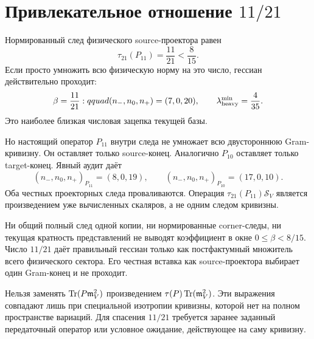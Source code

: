 \section{Привлекательное отношение \texorpdfstring{$11/21$}{11/21}}

Нормированный след физического source-проектора равен
\begin{equation}
 \tau_{21}(P_{11})=\frac{11}{21}<\frac8{15}.
 \label{eq:v7-common-trace-source-fraction}
\end{equation}
Если просто умножить всю физическую норму на это число, гессиан действительно
проходит:
\begin{equation}
 \beta=\frac{11}{21}:qquad
 (n_-,n_0,n_+)=(7,0,20),
 \qquad \lambda_{\rm heavy}^{\min}=\frac4{35}.
 \label{eq:v7-common-trace-source-fraction-pass}
\end{equation}
Это наиболее близкая числовая зацепка текущей базы.

Но настоящий оператор $P_{11}$ внутри следа не умножает всю двустороннюю
Gram-кривизну. Он оставляет только source-конец. Аналогично $P_{10}$ оставляет
только target-конец. Явный аудит даёт
\begin{equation}
 (n_-,n_0,n_+)_{P_{11}}=(8,0,19),
 \qquad
 (n_-,n_0,n_+)_{P_{10}}=(17,0,10).
 \label{eq:v7-common-trace-corner-insertion-signatures}
\end{equation}
Оба честных проекторных следа проваливаются. Операция
$\tau_{21}(P_{11})\mathcal S_V$ является произведением уже вычисленных
скаляров, а не одним следом кривизны.

\begin{theorem}
Ни общий полный след одной копии, ни нормированные corner-следы, ни текущая
кратность представлений не выводят коэффициент в окне
$0\le\beta<8/15$. Число $11/21$ даёт правильный гессиан только как
постфактумный множитель всего физического сектора. Его честная вставка как
source-проектора выбирает один Gram-конец и не проходит.
\end{theorem}

\begin{nogocriterion}
Нельзя заменять $\operatorname{Tr}(P\mathfrak m_V^2)$ произведением
$\tau(P)\operatorname{Tr}(\mathfrak m_V^2)$. Эти выражения совпадают лишь при специальной
изотропии кривизны, которой нет на полном пространстве вариаций. Для спасения
$11/21$ требуется заранее заданный передаточный оператор или условное
ожидание, действующее на саму кривизну.
\end{nogocriterion}

